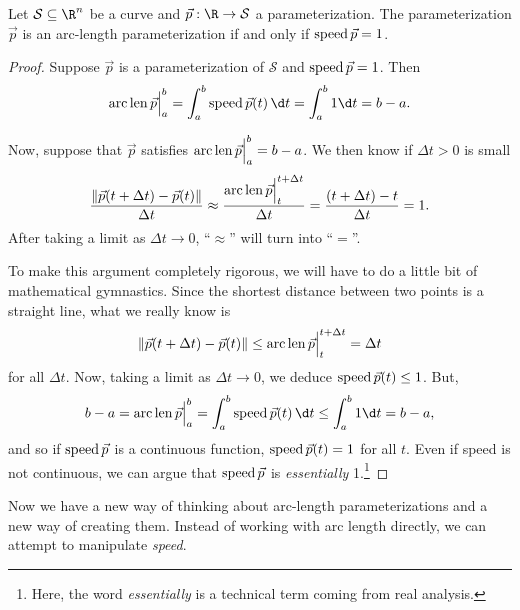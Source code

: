 \begin{theorem}
	Let $\mathcal S\subseteq\R^n$ be a curve and $\vec p:\R\to\mathcal S$
	a parameterization.  The parameterization $\vec p$ is an arc-length
	parameterization if and only if $\operatorname{speed}\vec p=1$.
\end{theorem}
\begin{proof}
	Suppose $\vec p$ is a parameterization of $\mathcal S$ and $\operatorname{speed} \vec p=1$.  Then
	\[
		\Arclenfrom{\vec p}{a}{b} = \int_a^b\Speed\vec p(t)\,\d t = \int_a^b1\d t = b-a.
	\]

	Now, suppose that $\vec p$ satisfies $\operatorname{arc\,len} \vec p \Big|_{a}^{b}=b-a$.  We then know if
	$\Delta t>0$ is small
	\[
		\frac{\lVert\vec p(t+\Delta t)-\vec p(t)\rVert}{\Delta t} \approx \frac{\operatorname{arc\,len} \vec p \Big|_{t}^{t+\Delta t}}{\Delta t}
		= \frac{(t+\Delta t) - t}{\Delta t} = 1.
	\]
	After taking a limit as $\Delta t\to 0$, ``$\approx$'' will turn into ``$=$''.

	To make this argument completely rigorous, we will have to do a little bit of
	mathematical gymnastics.  Since the shortest distance between two points is a straight
	line, what we really know is
	\[
		\lVert\vec p(t+\Delta t)-\vec p(t)\rVert \leq \operatorname{arc\,len} \vec p \Big|_{t}^{t+\Delta t}
		 = \Delta t
	\]
	for all $\Delta t$.  Now, taking a limit as $\Delta t\to 0$, we deduce $\operatorname{speed} \vec p(t)\leq 1$.  But,
	\[
		b-a = \Arclenfrom{\vec p}{a}{b} = \int_a^b \Speed \vec p(t)\,\d t \leq
		\int_a^b1\d t  = b-a,
	\]
	and so if $\operatorname{speed} \vec p$ is a continuous function, $\operatorname{speed}\vec p(t)=1$ for all $t$.
	Even if speed is not continuous, we can argue that $\operatorname{speed} \vec p$ is \emph{essentially} 1.\footnote{
	Here, the word \emph{essentially} is a technical term coming from real analysis.
		}
\end{proof}

Now we have a new way of thinking about arc-length parameterizations and a new way of creating them.
Instead of working with arc length directly, we can attempt to manipulate \emph{speed}.

